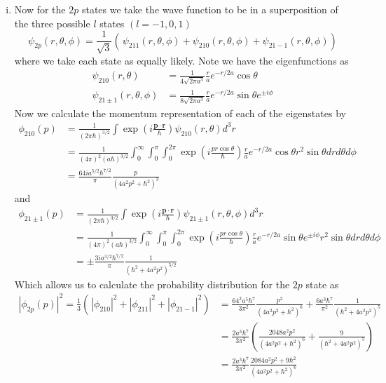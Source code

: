 \documentclass[11pt]{article}
\numberwithin{equation}{section}
\begin{document}
\begin{enumerate}[(i)]
\item Now for the $2p$ states we take the wave function to be in a superposition of the three
possible $l$ states $(l=-1,0,1)$
$$\psi_{2p}(r,\theta,\phi) = \frac{1}{\sqrt{3}}\left(\frac{}{}\psi_{211}(r,\theta,\phi)+\psi_{210}(r,\theta,\phi)+\psi_{21-1}(r,\theta,\phi)\right)$$
where we take each state as equally likely. Note we have the eigenfunctions as
\begin{align*}
\psi_{210}(r,\theta) &= \frac{1}{4\sqrt{2\pi{a^3}}}\frac{r}{a}e^{-r/2a}\cos\theta\\
\psi_{21\pm1}(r,\theta,\phi) &= \frac{1}{8\sqrt{2\pi{a^3}}}\frac{r}{a}e^{-r/2a}\sin\theta e^{\pm{i\phi}}
\end{align*}
Now we calculate the momentum representation of each of the eigenstates by
\begin{align*}
\phi_{210}(p) &= \frac{1}{(2\pi\hbar)^{3/2}}\int\exp\left(i\frac{\mathbf{p}\cdot\mathbf{r}}{\hbar}\right)\psi_{210}(r,\theta)d^3r\\
&= \frac{1}{(4\pi)^2(a\hbar)^{3/2}}\int_{0}^{\infty}\int_{0}^{\pi}\int_{0}^{2\pi}\exp\left(i\frac{pr\cos\theta}{\hbar}\right)\frac{r}{a}e^{-r/2a}\cos\theta{r^2}\sin\theta{dr}{d\theta}{d\phi}\\
&= \frac{64ia^{5/2}\hbar^{7/2}}{\pi}\frac{p}{(4a^2p^2+\hbar^2)^3}
\end{align*}
and
\begin{align*}
\phi_{21\pm1}(p) &= \frac{1}{(2\pi\hbar)^{3/2}}\int\exp\left(i\frac{\mathbf{p}\cdot\mathbf{r}}{\hbar}\right)\psi_{21\pm1}(r,\theta,\phi)d^3r\\
&= \frac{1}{(4\pi)^2(a\hbar)^{3/2}}\int_{0}^{\infty}\int_{0}^{\pi}\int_{0}^{2\pi}\exp\left(i\frac{pr\cos\theta}{\hbar}\right)\frac{r}{a}e^{-r/2a}\sin{\theta}e^{\pm{i\phi}}r^2\sin\theta{dr}{d\theta}{d\phi}\\
&= \pm\frac{3ia^{3/2}\hbar^{7/2}}{\pi}\frac{1}{(\hbar^2+4a^2p^2)^{5/2}}
\end{align*}
Which allows us to calculate the probability distribution for the $2p$ state as
\begin{align*}
|\phi_{2p}(p)|^2 = \frac{1}{3}\left(\frac{}{}|\phi_{210}|^2 +|\phi_{211}|^2 +|\phi_{21-1}|^2\right)   
&= \frac{64^2a^{5}\hbar^{7}}{3\pi^2}\frac{p^2}{(4a^2p^2+\hbar^2)^6} + \frac{6a^{3}\hbar^{7}}{\pi^2}\frac{1}{(\hbar^2+4a^2p^2)^{5}}\\
&= \frac{2a^3\hbar^7}{3\pi^2}\left(\frac{2048a^2p^2}{(4a^2p^2+\hbar^2)^6} + \frac{9}{(\hbar^2+4a^2p^2)^{5}}\right)\\
&= \frac{2a^3\hbar^7}{3\pi^2}\frac{2084a^2p^2+9\hbar^2}{(4a^2p^2+\hbar^2)^6}
\end{align*}
\end{enumerate}
\end{document}
